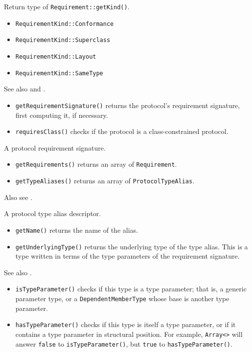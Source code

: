 \documentclass[../generics]{subfiles}
\begin{document}
Return type of \texttt{Requirement::getKind()}.
\begin{itemize}
\item \texttt{RequirementKind::Conformance}
\item \texttt{RequirementKind::Superclass}
\item \texttt{RequirementKind::Layout}
\item \texttt{RequirementKind::SameType}
\end{itemize}

See also  and .
\begin{itemize}
\item \texttt{getRequirementSignature()} returns the protocol's requirement signature, first computing it, if necessary.
\item \texttt{requiresClass()} checks if the protocol is a class-constrained protocol.
\end{itemize}

A protocol requirement signature.
\begin{itemize}
\item \texttt{getRequirements()} returns an array of \texttt{Requirement}.
\item \texttt{getTypeAliases()} returns an array of \texttt{ProtocolTypeAlias}.
\end{itemize}
Also see .

A protocol type alias descriptor.
\begin{itemize}
\item \texttt{getName()} returns the name of the alias.
\item \texttt{getUnderlyingType()} returns the underlying type of the type alias. This is a type written in terms of the type parameters of the requirement signature.
\end{itemize}

See also .
\begin{itemize}
\item \texttt{isTypeParameter()} checks if this type is a type parameter; that is, a generic parameter type, or a \texttt{DependentMemberType} whose base is another type parameter.
\item \texttt{hasTypeParameter()} checks if this type is itself a type parameter, or if it contains a type parameter in structural position. For example, \texttt{Array<>} will answer \texttt{false} to \texttt{isTypeParameter()}, but \texttt{true} to \texttt{hasTypeParameter()}.
\end{itemize}
\end{document}
